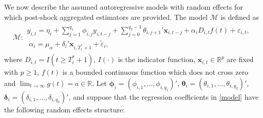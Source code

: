 \documentclass[11pt]{article}
\newcommand{\R}{\mathbb{R}}
\newcommand{\x}{\textbf{x}}
\def\mbf#1{\mathbf{#1}} %
\def\t#1{\tilde{#1}} %
\def\mc#1{\mathcal{#1}} %
\def\mc#1{\mathcal{#1}}
\theoremstyle{definition}
\begin{document}
\vspace{0.5cm} We now describe the assumed autoregressive models with random effects for which post-shock aggregated estimators are provided. The model $\mc{M}$ is defined as
\begin{align}
\mc{M} \colon \begin{array}{l}
  y_{i,t} =\eta_i + \sum_{j=1}^{q_1}\phi_{i,j}y_{i, t-j} + \sum_{j=0}^{q_2-1}\theta_{i,j+1}'\mbf{x}_{i,t-j} + \alpha_i D_{i,t}f(t) + \varepsilon_{i,t},\\[.2cm]
  \; \alpha_i = \mu_{\alpha} + \delta_i'\mbf{x}_{i, T_i^*+1} + \t{\varepsilon}_{i},
\end{array}\label{model}
\end{align}
where $D_{i,t} = I(t \geq T_i^* + 1)$, $I(\cdot)$ is the indicator function, $\x_{i,t} \in \R^{p}$ are fixed with $p \geq 1$, $f(t)$ is a bounded continuous function which does not cross zero and $\lim_{t\to\infty}g(t) = a \in \R$. Let 
$\mathbf{\phi}_i = (\phi_{i,1},\ldots,\phi_{i,q_1})'$, 
$\mathbf{\theta}_i = (\theta_{i,1},\ldots,\theta_{i,q_2})'$, 
$\mathbf{\delta}_i = (\delta_{i,1},\ldots,\delta_{i,q_3})'$, 
and suppose that the regression coefficients in \eqref{model} have the following random effects structure:
\end{document}
